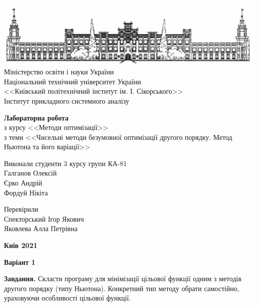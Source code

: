 \documentclass{extreport}
\begin{document}
\begin{titlepage}
    \thispagestyle{empty}
    \begin{center}
        \includegraphics[width = \textwidth]{kpi}
        Міністерство освіти і науки України\\
        Національний технічний університет України\\
        <<Київський політехнічний інститут ім. І. Сікорського>>\\
        Інститут прикладного системного аналізу
    \end{center}
    \vspace{40mm}
    \begin{center}
        \textbf{Лабораторна робота} \\
        з курсу <<Методи оптимізації>> \\
        з теми <<Чисельні методи безумовної оптимізації другого порядку. 
        Метод Ньютона та його варіації>>
    \end{center}
    \vspace{20mm}
    \begin{flushleft}
        Виконали студенти 3 курсу групи КА-81 \\
        Галганов Олексій \\
        Єрко Андрій \\
        Фордуй Нікіта
    \end{flushleft}
    \begin{flushright}
        Перевірили \\
        Спекторський Ігор Якович \\
        Яковлева Алла Петрівна
    \end{flushright}
    \vspace{30mm}
    \begin{center}
        \textbf{Київ 2021}
    \end{center}
\end{titlepage}

\begin{center}
    \textbf{Варіант 1}
\end{center}
\textbf{Завдання.} Скласти програму для мінімізації цільової функції
одним з методів другого порядку (типу Ньютона). Конкретний тип методу обрати
самостійно, ураховуючи особливості цільової функції.
\end{document}
